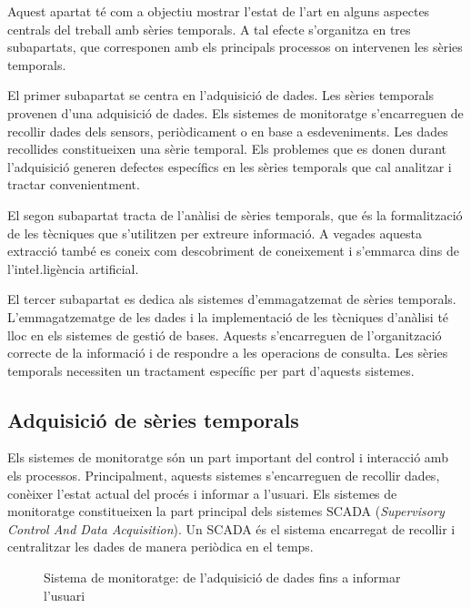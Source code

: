 Aquest apartat té com a objectiu mostrar l'estat de l'art en alguns
aspectes centrals del treball amb sèries temporals. A tal efecte
s'organitza en tres subapartats, que corresponen amb els principals
processos on intervenen les sèries temporals.
 

El primer subapartat se centra en l'adquisició de dades. Les sèries
temporals provenen d'una adquisició de dades. Els sistemes de
monitoratge s'encarreguen de recollir dades dels sensors,
periòdicament o en base a esdeveniments. Les dades recollides
constitueixen una sèrie temporal. Els problemes que es donen durant
l'adquisició generen defectes específics en les sèries temporals que
cal analitzar i tractar convenientment.


El segon subapartat tracta de l'anàlisi de sèries temporals, que és
la formalització de les tècniques que s'utilitzen per extreure
informació. A vegades aquesta extracció també es coneix com
descobriment de coneixement i s'emmarca dins de l'inte\l.ligència
artificial.


El tercer subapartat es dedica als sistemes d'emmagatzemat de sèries
temporals. L'emmagatzematge de les dades i la implementació de les
tècniques d'anàlisi té lloc en els sistemes de gestió de
bases. Aquests s'encarreguen de l'organització correcte de la
informació i de respondre a les operacions de consulta. Les sèries
temporals necessiten un tractament específic per part d'aquests
sistemes.






\subsection{Adquisició de sèries temporals}

Els sistemes de monitoratge són un part important del control i interacció amb els processos. Principalment, aquests sistemes s'encarreguen de recollir dades, conèixer l'estat actual del procés i informar a l'usuari. Els sistemes de monitoratge constitueixen la part principal dels sistemes SCADA (\emph{Supervisory Control And Data Acquisition}). Un SCADA  és el sistema encarregat de recollir i centralitzar les dades de manera periòdica en el temps.



\begin{figure}[tp]
  \begin{center}
    \scriptsize 
    
  \end{center}
  \caption{Sistema de monitoratge: de l'adquisició de dades fins a informar l'usuari}
  \label{fig:sistema_monitoratge}
\end{figure}


